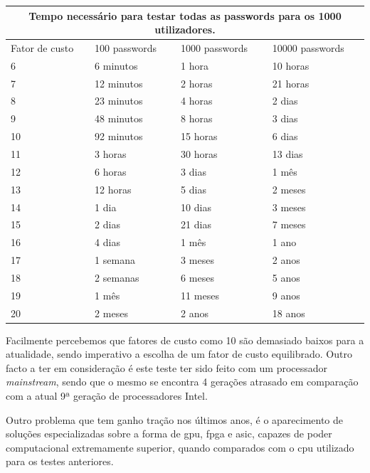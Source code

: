 \begin{center}
    \begin{tabular}{ |p{2.5cm}|p{3cm}|p{3cm}|p{3cm}|  }
        \hline
        \multicolumn{4}{|c|}{Tempo necessário para testar todas as passwords para os 1000 utilizadores.} \\
        \hline
        Fator de custo & 100 passwords & 1000 passwords & 10000 passwords\\
        \hline 
        6 & 6 minutos & 1 hora & 10 horas\\
        7 & 12 minutos & 2 horas & 21 horas\\
        8 & 23 minutos & 4 horas & 2 dias\\
        9 & 48 minutos & 8 horas & 3 dias\\
        10 & 92 minutos & 15 horas & 6 dias\\
        11 & 3 horas & 30 horas & 13 dias\\
        12 & 6 horas & 3 dias & 1 mês\\
        13 & 12 horas & 5 dias & 2 meses\\
        14 & 1 dia & 10 dias & 3 meses\\
        15 & 2 dias & 21 dias & 7 meses\\
        16 & 4 dias & 1 mês & 1 ano\\
        17 & 1 semana & 3 meses & 2 anos\\
        18 & 2 semanas & 6 meses & 5 anos\\
        19 & 1 mês & 11 meses & 9 anos\\
        20 & 2 meses & 2 anos & 18 anos\\
        \hline
    \end{tabular}
\label{tab:bcrypt_bruteforce} 
\end{center}

Facilmente percebemos que fatores de custo como 10 são demasiado baixos para a atualidade, sendo imperativo a escolha de um fator de custo equilibrado. Outro facto a ter em consideração é este teste ter sido feito com um processador \emph{mainstream}, sendo que o mesmo se encontra 4 gerações atrasado em comparação com a atual 9ª geração de processadores Intel.

Outro problema que tem ganho tração nos últimos anos, é o aparecimento de soluções especializadas sobre a forma de \gls{gpu}, \gls{fpga}\cite{wiemer2014high}\cite{malvoni2014your} e \gls{asic}, capazes de poder computacional extremamente superior, quando comparados com o \gls{cpu} utilizado para os testes anteriores.

